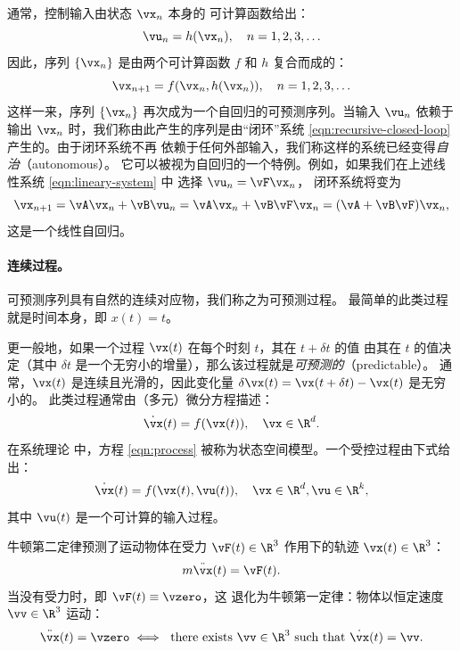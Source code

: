 \documentclass[../../book-main_zh.tex]{subfiles}
\begin{document}
通常，控制输入由状态 \(\vx_{n}\) 本身的
可计算函数给出：
\begin{equation}
    \vu_{n} = h(\vx_{n}), \quad n = 1, 2, 3, \ldots
    \label{eqn:control-function}
\end{equation}
因此，序列 \(\{\vx_{n}\}\) 是由两个可计算函数 \(f\) 和 \(h\) 复合而成的：
\begin{equation}
    \vx_{n+1} = f(\vx_{n}, h(\vx_{n})), \quad n = 1, 2, 3, \ldots
    \label{eqn:recursive-closed-loop}
\end{equation}
这样一来，序列 \(\{\vx_{n}\}\) 再次成为一个自回归的可预测序列。当输入 \(\vu_{n}\)
依赖于输出 \(\vx_{n}\) 时，我们称由此产生的序列是由“闭环”系统
\eqref{eqn:recursive-closed-loop} 产生的。由于闭环系统不再
依赖于任何外部输入，我们称这样的系统已经变得\textit{自治}（autonomous）。
它可以被视为自回归的一个特例。例如，如果我们在上述线性系统 \eqref{eqn:lineary-system} 中
选择 \(\vu_{n} = \vF\vx_{n}\)，
闭环系统将变为
\begin{equation}
    \vx_{n+1} = \vA\vx_{n} + \vB\vu_{n} = \vA\vx_{n} + \vB\vF\vx_{n}
    = (\vA + \vB\vF)\vx_{n},
    \label{eqn:lineary-system-closed}
\end{equation}
这是一个线性自回归。

\paragraph{连续过程。}
可预测序列具有自然的连续对应物，我们称之为可预测过程。
最简单的此类过程就是时间本身，即 \(x(t) = t\)。

更一般地，如果一个过程 \(\vx(t)\) 在每个时刻 \(t\)，其在 \(t + \delta t\) 的值
由其在 \(t\) 的值决定（其中 \(\delta t\) 是一个无穷小的增量），那么该过程就是\textit{可预测的}（predictable）。
通常，\(\vx(t)\) 是连续且光滑的，因此变化量
\(\delta \vx(t) = \vx(t + \delta t) - \vx(t)\) 是无穷小的。
此类过程通常由（多元）微分方程描述：
\begin{equation}
    \dot{\vx}(t) = f(\vx(t)), \quad \vx \in \R^{d}.
    \label{eqn:process}
\end{equation}
在系统理论 \cite{Cal:Des,Sastry-Nonlinear} 中，方程
\eqref{eqn:process} 被称为状态空间模型。一个受控过程由下式给出：
\begin{equation}
    \dot{\vx}(t) = f(\vx(t), \vu(t)), \quad \vx \in \R^{d}, \vu \in \R^{k},
    \label{eqn:process-controlled}
\end{equation}
其中 \(\vu(t)\) 是一个可计算的输入过程。

\begin{example}
    牛顿第二定律预测了运动物体在受力 \(\vF(t) \in \R^{3}\) 作用下的轨迹 \(\vx(t) \in \R^{3}\)：
    \begin{equation}
        m\ddot{\vx}(t) = \vF(t).
        \label{eqn:newton-second}
    \end{equation}
    当没有受力时，即 \(\vF(t) \equiv \vzero\)，这
    退化为牛顿第一定律：物体以恒定速度 \(\vv \in \R^{3}\) 运动：
    \begin{equation}
        \ddot{\vx}(t) = \vzero \iff \ \text{there exists } \vv \in
        \R^{3} \text{ such that } \dot{\vx}(t) = \vv.
        \label{eqn:newton-first}
    \end{equation}
\end{example}
\end{document}
